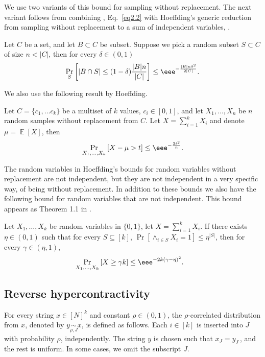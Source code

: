 \documentclass{toc}
\newcommand{\Prob}[2][]{\Pr_{{#1}}\left[#2\right]} %
\DeclareMathOperator*{\E}{\mathbb{E}} %
\newcommand{\abs}[1]{\lvert#1\rvert} %
\newcommand{\set}[1]{\{#1\}} %
\newcommand\cor[1]{\underset{\scriptscriptstyle#1}{\sim}} %
\begin{document}
We use
%
two variants %
of this
%
bound for sampling without replacement.
%
%
The next variant %
%
follows from combining ,
Eq.~\eqref{eq2.2}   %
with Hoeffding’s generic reduction
from sampling without replacement to a sum of independent variables,
%
\cite[Theorem 4]{hoeffding1994probability}.  %
\begin{fact}\label{fact:Chernoff-rep} %
%
	Let $C$ be a set, and let $B\subset C$ be  subset. Suppose we pick a random subset $S\subset C$ of size $n < \abs{C}$, then for every $\delta\in (0,1)$
	\[  \Prob[S]{\abs{B\cap S}\leq (1-\delta)\frac{\abs{B}n}{\abs{C}}}\leq \eee^{-\frac{\abs{B}n\delta^2}{2\abs{C}}}.  \]
\end{fact}
%
%
We also use the following result by Hoeffding. %
\begin{fact}\label{fact:hoff-rep}
	Let $C=\set{c_1,\ldots c_k}$ be a 
	multiset %
	of $k$ values, $c_i\in[0,1]$, and let $X_1,\ldots, X_n$ be $n$ random samples without replacement from $C$. Let $X=\sum_{i=1}^k X_i$ and denote $\mu=\E[X]$, then
	\[ \Prob[X_1,\ldots, X_k]{{X-\mu}> t}\leq \eee^{-\frac{2t^2}{n}}. \]
\end{fact}

%
%
The random variables in Hoeffding’s bounds for random variables without replacement are not independent, but they are not independent in a very specific way, of being without replacement. In addition to these bounds we also have the following bound for random variables that are not independent. %
%
%
%
%
%
%
%
%
%
%
%
This bound appears as %
Theorem 1.1  %
in \cite{IK10}.
\begin{fact}\label{fact:gen-cher}
Let $X_1,\ldots, X_k$ be random variables in $\{0,1\}$, let $X=\sum_{i=1}^k X_i$. If there exists $\eta\in(0,1)$ such that for every $S\subseteq [k]$, $\Pr[\wedge_{i\in S}X_i=1]\leq\eta^{\abs{S}}$, then for every $\gamma\in  (\eta,1)$,
\begin{align*}
	&\Prob[X_1,\ldots, X_k]{X \geq \gamma k}\leq \eee^{-2k(\gamma-\eta)^2}.
\end{align*}
\end{fact}


\subsection{Reverse hypercontractivity}
\begin{definition}
For every string $x\in[N]^k$ and constant $\rho\in(0,1)$, the $\rho$-correlated distribution from $x$, denoted by $y \cor{\rho,J}x$, %
is defined %
as follows.  Each  %
$i\in[k]$ is inserted into $J$ with probability $\rho$, independently.
%
%
%
The string $y$ %
is chosen
such that $x_J=y_J$\,, and the rest is uniform. In some cases, we omit the subscript $J$.
\end{definition}
\end{document}
